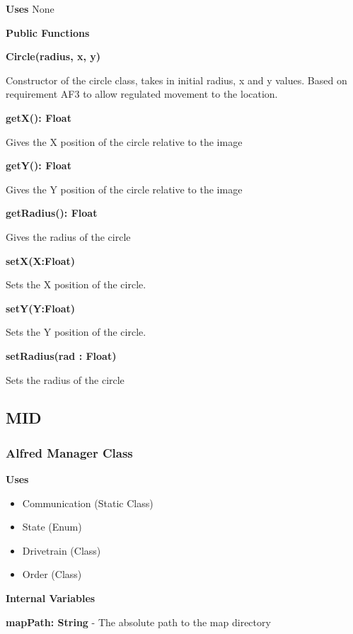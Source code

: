 \documentclass [10pt]{article}
\begin{document}
\textbf{Uses}
None

\textbf{Public Functions}

\textbf{Circle(radius, x, y)}

Constructor of the circle class, takes in initial radius, x and y values. Based on requirement AF3 to allow regulated movement to the location.

\textbf{getX(): Float}

Gives the X position of the circle relative to the image

\textbf{getY(): Float}

Gives the Y position of the circle relative to the image

\textbf{getRadius(): Float}

Gives the radius of the circle

\textbf{setX(X:Float)}

Sets the X position of the circle.

\textbf{setY(Y:Float)}

Sets the Y position of the circle.

\textbf{setRadius(rad : Float)}

Sets the radius of the circle



\subsection{MID}


\subsubsection{Alfred Manager Class}

\textbf{Uses}
\begin{itemize}
	\item Communication (Static Class)
	\item State (Enum)
	\item Drivetrain (Class)
	\item Order (Class)
\end{itemize}

\textbf{Internal Variables}

\textbf{mapPath: String} - The absolute path to the map directory
\end{document}
